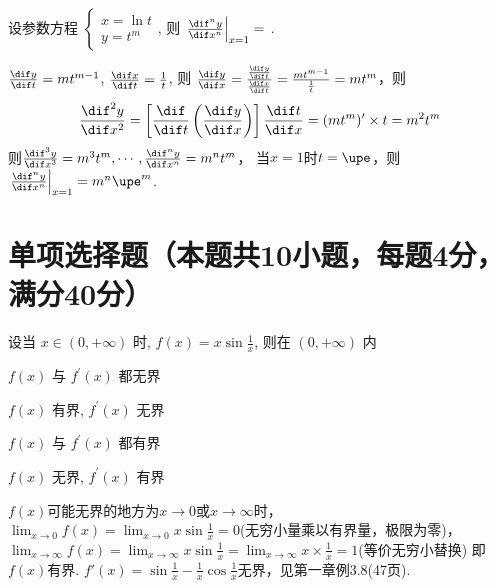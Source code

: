 \documentclass{CWNUExam}
\begin{document}
\begin{problem}
  设参数方程 $
    \begin{cases}
      x=\ln t \\
      y=t^{m}
    \end{cases}
  $, 则 $\left.\frac{\dif^{n} y}{\dif x^{n}}\right|_{x=1}=$
  \fillin[$m^n \upe^m$].
\end{problem}

\begin{analysis}
  $\frac{\dif y}{\dif t} = mt^{m-1}$, $\frac{\dif x}{\dif t} = \frac{1}{t}$, 则
  $\frac{\dif y}{\dif x} = \frac{\frac{\dif y}{\dif t}}{\frac{\dif x}{\dif t}} = \frac{mt^{m-1}}{\frac{1}{t}} = mt^m$，则
  $$\frac{\dif^2 y}{\dif x^2} = \left[ \frac{\dif }{\dif t} \left( \frac{\dif y}{\dif x} \right) \right] \frac{\dif t}{\dif x} = (mt^m)' \times t = m^2 t^m$$
  则$\frac{\dif^3 y}{\dif x^3} = m^3 t^m, \cdots, \frac{\dif^n y}{\dif x^n} = m^n t^m$，
  当$x=1$时$t = \upe$，则 $\left.\frac{\dif^{n} y}{\dif x^{n}}\right|_{x=1}=m^n \upe^m$.
\end{analysis}

\section{单项选择题（本题共10小题，每题4分，满分40分）}

\begin{problem}
  设当 $x \in(0,+\infty)$ 时, $f(x)=x \sin \frac{1}{x}$, 则在 $(0,+\infty)$ 内
  \paren[B]
  \begin{choices}
    \item $f(x)$ 与 $f^{\prime}(x)$ 都无界
    \item $f(x)$ 有界, $f^{\prime}(x)$ 无界
    \item $f(x)$ 与 $f^{\prime}(x)$ 都有界
    \item $f(x)$ 无界, $f^{\prime}(x)$ 有界
  \end{choices}
\end{problem}

\begin{analysis}
  $f(x)$可能无界的地方为$x \to 0$或$x \to \infty$时，$\lim _{x \to 0} f(x) = \lim _{x \to 0} x \sin \frac{1}{x} = 0$(无穷小量乘以有界量，极限为零)，
  $\lim _{x \to \infty} f(x) = \lim _{x \to \infty} x \sin \frac{1}{x} = \lim _{x \to \infty} x \times \frac{1}{x} = 1$(等价无穷小替换)
  即$f(x)$有界.
  $f'(x) = \sin \frac{1}{x} - \frac{1}{x} \cos \frac{1}{x}$无界，见第一章例3.8(47页).
\end{analysis}
\end{document}
